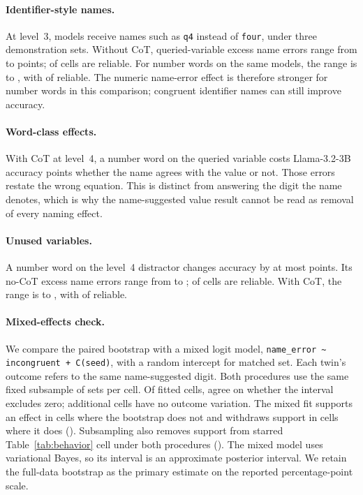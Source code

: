 \paragraph{Identifier-style names.} At level~3,  models receive names such as
\texttt{q4} instead of \texttt{four}, under three demonstration sets. Without CoT, queried-variable
excess name errors range from  to  points;
 of  cells are reliable. For number words
on the same models, the range is  to , with
 of  reliable. The numeric name-error effect is
therefore stronger for number words in this comparison; congruent identifier names can still
improve accuracy.

\paragraph{Word-class effects.} With CoT at level~4, a number word on the queried variable costs
Llama-3.2-3B  accuracy points whether the name agrees with the value or
not. Those errors restate the wrong equation. This is distinct from answering the digit the
name denotes, which is why the name-suggested value result cannot be read as removal of every naming effect.

\paragraph{Unused variables.} A number word on the level~4 distractor changes accuracy by at
most  points. Its no-CoT excess name errors range from  to
;  of  cells are reliable.
With CoT, the range is  to , with
 of  reliable.

\paragraph{Mixed-effects check.} We compare the paired bootstrap with a mixed logit model,
\texttt{name\_error \textasciitilde{} incongruent + C(seed)}, with a random intercept for
matched set. Each twin's outcome refers to the same name-suggested digit. Both procedures use the same
fixed subsample of  sets per cell. Of  fitted cells,
 agree on whether the interval excludes zero;  additional
cells have no outcome variation. The mixed fit supports an effect in  cells
where the bootstrap does not and withdraws support in  cells where it does
(). Subsampling also removes support from  starred
Table~\ref{tab:behavior} cell under both procedures (). The mixed
model uses variational Bayes, so its interval is an approximate posterior interval. We retain
the full-data bootstrap as the primary estimate on the reported percentage-point scale.


